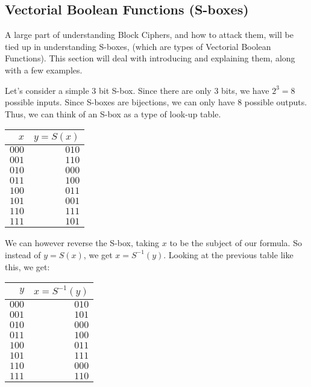 \subsection{Vectorial Boolean Functions (S-boxes)}
A large part of understanding Block Ciphers, and how to attack them, will be
tied up in understanding S-boxes, (which are types of Vectorial Boolean
Functions). This section will deal with introducing and explaining them, along
with a few examples.


\begin{example}
Let's consider a simple 3 bit S-box. Since there are only 3 bits, we have 
$2^3 = 8$ possible inputs. Since S-boxes are bijections, we can only have
8 possible outputs. Thus, we can think of an S-box as a type of look-up
table.

\begin{center}
\begin{tabular}{|r|r|}
\hline
$x$ & $y = S(x)$ \\\hline
$000$ & $010$ \\\hline
$001$ & $110$ \\\hline
$010$ & $000$ \\\hline
$011$ & $100$ \\\hline
$100$ & $011$ \\\hline
$101$ & $001$ \\\hline
$110$ & $111$ \\\hline
$111$ & $101$ \\\hline
\end{tabular}
\end{center}

We can however reverse the S-box, taking $x$ to be the subject of our formula.
So instead of $y = S(x)$, we get $x = S^{-1}(y)$. Looking at the previous
table like this, we get:

\begin{center}
\begin{tabular}{|r|r|}
\hline
$y$ & $x = S^{-1}(y)$ \\\hline
$000$ & $010$ \\\hline
$001$ & $101$ \\\hline
$010$ & $000$ \\\hline
$011$ & $100$ \\\hline
$100$ & $011$ \\\hline
$101$ & $111$ \\\hline
$110$ & $000$ \\\hline
$111$ & $110$ \\\hline
\end{tabular}
\end{center}

\end{example}

